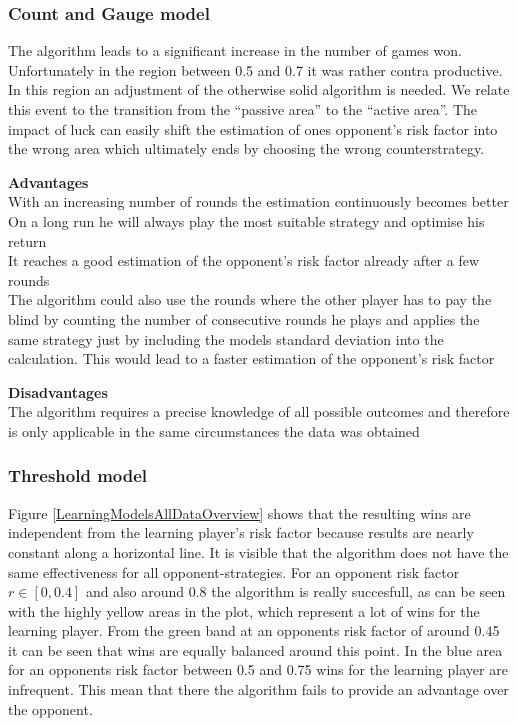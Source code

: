 \documentclass[11pt]{article}
\begin{document}
\subsubsection{Count and Gauge model}
The algorithm leads to a significant increase in the number of games won. Unfortunately in the region between 0.5 and 0.7 it was rather contra productive. In this region an adjustment of the otherwise solid algorithm is needed.
We relate this event to the transition from the “passive area” to the “active area”. The impact of luck can easily shift the estimation of ones opponent's risk factor into the wrong area which ultimately ends by choosing the wrong counterstrategy.\\


\begin{minipage}[t]{0.48\textwidth}
\textbf{Advantages}\\
With an increasing number of rounds the estimation continuously becomes better\\
On a long run he will always play the most suitable strategy and optimise his return\\
It reaches a good estimation of the opponent's risk factor already after a few rounds\\
The algorithm could also use the rounds where the other player has to pay the blind by counting the number of consecutive rounds he plays and applies the same strategy just by including the models standard deviation into the calculation. This would lead to a faster estimation of the opponent's risk factor
\end{minipage}\hfill
\begin{minipage}[t]{0.48\textwidth}
\textbf{Disadvantages}\\
The algorithm requires a precise knowledge of all possible outcomes and therefore is only applicable in the same circumstances the data was obtained\\
\end{minipage}

\subsubsection{Threshold model}

Figure \ref{LearningModelsAllDataOverview} shows that the resulting wins are independent from the learning player's risk factor because results are nearly constant along a horizontal line. It is visible that the algorithm does not have the same effectiveness for all opponent-strategies. For an opponent risk factor $r \in [0,0.4]$  and also around 0.8 the algorithm is really succesfull, as can be seen with the highly yellow areas in the plot, which represent a lot of wins for the learning player. From the green band at an opponents risk factor of around 0.45 it can be seen that wins are equally balanced around this point. In the blue area for an opponents risk factor between 0.5 and 0.75 wins for the learning player are infrequent. This mean that there the algorithm fails to provide an advantage over the opponent.\\
\end{document}
